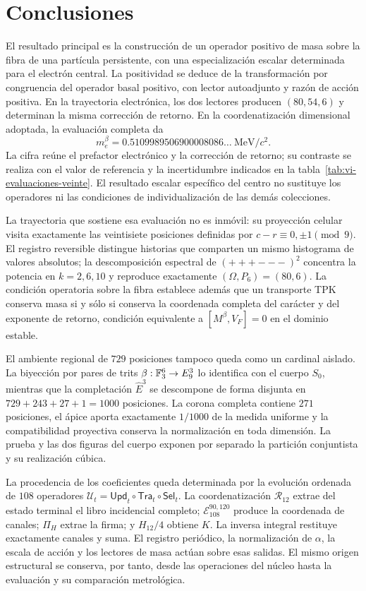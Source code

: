 \section{Conclusiones}
\label{vi:sec:conclusiones}

El resultado principal es la construcción de un operador positivo de masa
sobre la fibra de una partícula persistente, con una especialización
escalar determinada para el electrón central. La positividad se deduce de
la transformación por congruencia del operador basal positivo, con lector
autoadjunto y razón de acción positiva. En la trayectoria electrónica,
los dos lectores producen \((80,54,6)\) y determinan la misma corrección
de retorno. En la coordenatización dimensional adoptada, la evaluación completa da
\[
 m_e^{\beta}=0.5109989506900008086\ldots\ \mathrm{MeV}/c^2.
\]
La cifra reúne el prefactor electrónico y la corrección de retorno; su
contraste se realiza con el valor de referencia y la incertidumbre
indicados en la tabla~\ref{tab:vi-evaluaciones-veinte}. El resultado
escalar específico del centro no sustituye los operadores ni las
condiciones de individualización de las demás colecciones.

La trayectoria que sostiene esa evaluación no es inmóvil: su proyección
celular visita exactamente las veintisiete posiciones definidas por
$c-r\equiv0,\pm1\pmod9$. El registro reversible distingue historias que
comparten un mismo histograma de valores absolutos; la descomposición espectral
de $(+++---)^2$ concentra la potencia en $k=2,6,10$ y reproduce exactamente
$(\Omega,P_6)=(80,6)$. La
condición operatoria sobre la fibra establece además que un transporte TPK
conserva masa si y sólo si conserva la coordenada completa del carácter y del
exponente de retorno, condición equivalente a $[M^\beta,V_F]=0$ en el dominio
estable.

El ambiente regional de \(729\) posiciones tampoco queda como un cardinal
aislado. La biyección por pares de trits
\(\beta:\mathbb F_3^6\to E_9^3\) lo identifica con el cuerpo \(S_0\), mientras
que la completación \(\widehat E^3\) se descompone de forma disjunta en
\(729+243+27+1=1000\) posiciones. La corona completa contiene \(271\)
posiciones, el ápice aporta exactamente \(1/1000\) de la medida uniforme y
la compatibilidad proyectiva conserva la normalización en toda dimensión.
La prueba y las dos figuras del cuerpo exponen por separado la partición
conjuntista y su realización cúbica.

La procedencia de los coeficientes queda determinada por la evolución
ordenada de \(108\) operadores
\(\mathcal U_t=\mathsf{Upd}_t\circ\mathsf{Tra}_t\circ\mathsf{Sel}_t\).
La coordenatización \(\mathcal R_{12}\) extrae del estado terminal el libro
incidencial completo; \(\mathcal E_{108}^{90,120}\) produce la coordenada
de canales; \(\Pi_H\) extrae la firma; y \(H_{12}/4\) obtiene \(K\).
La inversa integral restituye exactamente canales y suma. El registro
periódico, la normalización de \(\alpha\), la escala de acción y los
lectores de masa actúan sobre esas salidas. El mismo origen estructural
se conserva, por tanto, desde las operaciones del núcleo hasta la
evaluación y su comparación metrológica.

